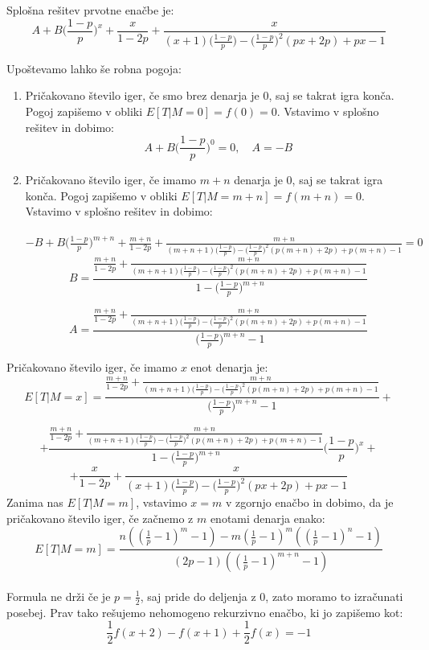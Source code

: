 \documentclass[12pt, a4paper]{article}
\begin{document}
Splošna rešitev prvotne enačbe je: $$A + B\bigg( \frac{1-p}{p} \bigg )^x+\frac{x}{1-2p}+\frac{x}{(x+1)\big( \frac{1-p}{p} \big )-\big( \frac{1-p}{p} \big )^2(px+2p)+px-1}$$

Upoštevamo lahko še robna pogoja:
\begin{enumerate}
\item Pričakovano število iger, če smo brez denarja je 0, saj se takrat igra konča. Pogoj zapišemo v obliki $E[T|M= 0] = f(0) = 0$. Vstavimo v splošno rešitev in dobimo:
$$A + B\bigg( \frac{1-p}{p} \bigg )^0 = 0, \quad A = -B$$
\item Pričakovano število iger, če imamo $m+n$ denarja je 0, saj se takrat igra konča. Pogoj zapišemo v obliki $E[T|M= m+n] = f(m+n) = 0$. Vstavimo v splošno rešitev in dobimo:\\\\
$-B + B\bigg( \frac{1-p}{p} \bigg )^{m+n}+\frac{m+n}{1-2p}+\frac{m+n}{(m+n+1)\big( \frac{1-p}{p} \big )-\big( \frac{1-p}{p} \big )^2(p(m+n)+2p)+p(m+n)-1}=0$\\

$$B = \frac{\frac{m+n}{1-2p}+\frac{m+n}{(m+n+1)\big( \frac{1-p}{p} \big )-\big( \frac{1-p}{p} \big )^2(p(m+n)+2p)+p(m+n)-1}}{1-\big( \frac{1-p}{p} \big )^{m+n}}$$

$$A = \frac{\frac{m+n}{1-2p}+\frac{m+n}{(m+n+1)\big( \frac{1-p}{p} \big )-\big( \frac{1-p}{p} \big )^2(p(m+n)+2p)+p(m+n)-1}}{\big( \frac{1-p}{p} \big )^{m+n}-1}$$
\end{enumerate}

Pričakovano število iger, če imamo $x$ enot denarja je: $$E[ T | M = x]= \frac{\frac{m+n}{1-2p}+\frac{m+n}{(m+n+1)\big( \frac{1-p}{p} \big )-\big( \frac{1-p}{p} \big )^2(p(m+n)+2p)+p(m+n)-1}}{\big( \frac{1-p}{p} \big )^{m+n}-1}+$$

 $$+\frac{\frac{m+n}{1-2p}+\frac{m+n}{(m+n+1)\big( \frac{1-p}{p} \big )-\big( \frac{1-p}{p} \big )^2(p(m+n)+2p)+p(m+n)-1}}{1-\big( \frac{1-p}{p} \big )^{m+n}}\big( \frac{1-p}{p} \big )^x+$$ $$+\frac{x}{1-2p}+\frac{x}{(x+1)\big( \frac{1-p}{p} \big )-\big( \frac{1-p}{p} \big )^2(px+2p)+px-1}$$
 Zanima nas $E[T|M=m]$, vstavimo $x=m$ v zgornjo enačbo in dobimo, da je pričakovano število iger, če začnemo z $m$ enotami denarja enako: $$E[T|M=m]=\frac{n \left(\left(\frac{1}{p}-1\right)^m-1\right)-m \left(\frac{1}{p}-1\right)^m
   \left(\left(\frac{1}{p}-1\right)^n-1\right)}{(2 p-1)
   \left(\left(\frac{1}{p}-1\right)^{m+n}-1\right)}$$
 \\
 Formula ne drži če je $p = \frac{1}{2}$, saj pride do deljenja z 0, zato moramo to izračunati posebej. Prav tako rešujemo nehomogeno rekurzivno enačbo, ki jo zapišemo kot: $$\frac{1}{2}f(x+2)-f(x+1)+\frac{1}{2}f(x)=-1$$
\end{document}
